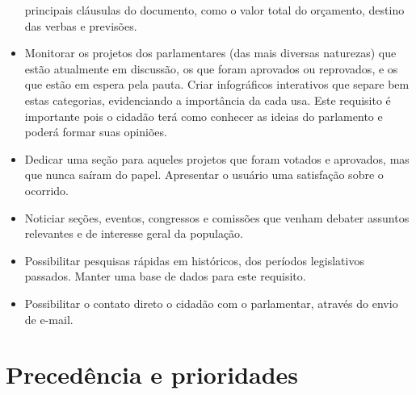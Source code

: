\documentclass[12pt, a4paper]{article}
\begin{document}
\begin{itemize}
        principais cláusulas do documento, como o valor total do orçamento,
        destino das verbas e previsões.
    \item Monitorar os projetos dos parlamentares (das mais diversas naturezas)
        que estão atualmente em discussão, os que foram aprovados ou
        reprovados, e os que estão em espera pela pauta. Criar infográficos
        interativos que separe bem estas categorias, evidenciando a importância
        da cada usa. Este requisito é importante pois o cidadão terá como
        conhecer as ideias do parlamento e poderá formar suas opiniões.
    \item Dedicar uma seção para aqueles projetos que foram votados e
        aprovados, mas que nunca saíram do papel. Apresentar o usuário uma
        satisfação sobre o ocorrido.
    \item Noticiar seções, eventos, congressos e comissões que venham debater
        assuntos relevantes e de interesse geral da população.
    \item Possibilitar pesquisas rápidas em históricos, dos períodos
        legislativos passados. Manter uma base de dados para este requisito.
    \item Possibilitar o contato direto o cidadão com o
    parlamentar, através do envio de e-mail.
    \end{itemize}

    \section{Precedência e prioridades}
       
\end{document}

